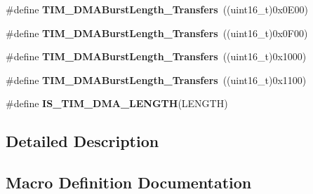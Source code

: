 \begin{DoxyCompactItemize}
\item 
\#define {\bfseries T\+I\+M\+\_\+\+D\+M\+A\+Burst\+Length\+\_\+Transfers}~((uint16\+\_\+t)0x0\+E00)\hypertarget{group___t_i_m___d_m_a___burst___length_gad13373f5fd246557a4fc487dc43c37ec}{}\label{group___t_i_m___d_m_a___burst___length_gad13373f5fd246557a4fc487dc43c37ec}

\item 
\#define {\bfseries T\+I\+M\+\_\+\+D\+M\+A\+Burst\+Length\+\_\+Transfers}~((uint16\+\_\+t)0x0\+F00)\hypertarget{group___t_i_m___d_m_a___burst___length_gafb644e6033f7b46c602b02754b69fde0}{}\label{group___t_i_m___d_m_a___burst___length_gafb644e6033f7b46c602b02754b69fde0}

\item 
\#define {\bfseries T\+I\+M\+\_\+\+D\+M\+A\+Burst\+Length\+\_\+Transfers}~((uint16\+\_\+t)0x1000)\hypertarget{group___t_i_m___d_m_a___burst___length_ga5b2c97f650a3c1726965187d852b8cc5}{}\label{group___t_i_m___d_m_a___burst___length_ga5b2c97f650a3c1726965187d852b8cc5}

\item 
\#define {\bfseries T\+I\+M\+\_\+\+D\+M\+A\+Burst\+Length\+\_\+Transfers}~((uint16\+\_\+t)0x1100)\hypertarget{group___t_i_m___d_m_a___burst___length_gaed9f2afef174079f6eb6927abd995b9b}{}\label{group___t_i_m___d_m_a___burst___length_gaed9f2afef174079f6eb6927abd995b9b}

\item 
\#define {\bfseries I\+S\+\_\+\+T\+I\+M\+\_\+\+D\+M\+A\+\_\+\+L\+E\+N\+G\+TH}(L\+E\+N\+G\+TH)
\end{DoxyCompactItemize}


\subsection{Detailed Description}


\subsection{Macro Definition Documentation}
